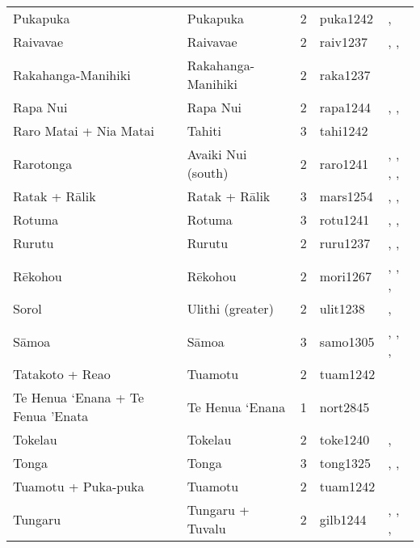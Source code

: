 \begin{longtable}{p{4.5cm}p{2cm}p{2cm}p{2cm}p{4cm}}
  Pukapuka & Pukapuka & 2 & puka1242 & \citet{beagleholeandbeaglehole1938}, \citet{macgregor1935} \\ 
  Raivavae & Raivavae & 2 & raiv1237 & \citet{aitken1930ethnology}, \citet{bollt2008excavations}, \citet{edwards2003archaeological} \\ 
  Rakahanga-Manihiki & Rakahanga-Manihiki & 2 & raka1237 & \citet{buck1932a} \\ 
  Rapa Nui & Rapa Nui & 2 & rapa1244 & \citet{sahlins1958social}, \citet{kirch1984evolution}, \citet{metraux_1971} \\ 
  Raro Matai + Nia Matai & Tahiti & 3 & tahi1242 & \citet{oliver2019ancient} \\ 
  Rarotonga & Avaiki Nui (south) & 2 & raro1241 & \citet{bellwood1971varieties}, \citet{buck1934}, \citet{crocombe_1967}, \citet{hayes1981cook}, \citet{walter1996} \\ 
  Ratak + Rālik & Ratak + Rālik & 3 & mars1254 & \citet{carruci1991marshall}, \citet{erdland1914}, \citet{williamson_1982} \\ 
  Rotuma & Rotuma & 3 & rotu1241 & \citet{gardiner1898natives}, \citet{howard1963conservatism}, \citet{howard1991} \\ 
  Rurutu & Rurutu & 2 & ruru1237 & \citet{aitken1930ethnology}, \citet{bollt2008excavations}, \citet{edwards2003archaeological} \\ 
  Rēkohou & Rēkohou & 2 & mori1267 & \citet{sahlins1958social}, \citet{buck1952}, \citet{kirch1984evolution}, \citet{van1995maori} \\ 
  Sorol & Ulithi (greater) & 2 & ulit1238 & \citet{lessa1950}, \citet{lessa1966} \\ 
  Sāmoa & Sāmoa & 3 & samo1305 & \citet{sahlins1958social}, \citet{buck1930}, \citet{keesing1934}, \citet{watters_1958} \\ 
  Tatakoto + Reao & Tuamotu & 2 & tuam1242 & \citet{emory1975material} \\ 
  Te Henua ‘Enana + Te Fenua ’Enata & Te Henua ‘Enana & 1 & nort2845 & \citet{sahlins1958social} \\ 
  Tokelau & Tokelau & 2 & toke1240 & \citet{hooper1973demographic}, \citet{macgregor1937} \\ 
  Tonga & Tonga & 3 & tong1325 & \citet{kirch1984evolution}, \citet{cummins1977tongan}, \citet{ferdon1988early} \\ 
  Tuamotu + Puka-puka & Tuamotu & 2 & tuam1242 & \citet{emory1975material} \\ 
  Tungaru & Tungaru + Tuvalu & 2 & gilb1244 & \citet{lambert1966}, \citet{lambert1975makin}, \citet{lambert1991}, \citet{macdonald1982cinderellas} \\ 

\end{longtable}
